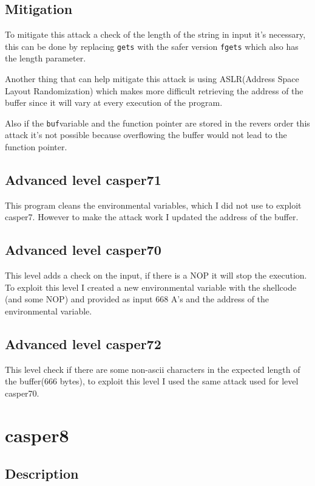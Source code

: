 \documentclass[a4paper,12pt]{article}
\begin{document}
\subsection{Mitigation}

To mitigate this attack a check of the length of the string in input it's necessary, this can be done by replacing \texttt{gets} with the safer version \texttt{fgets} which also has the length parameter.

Another thing that can help mitigate this attack is using ASLR(Address Space Layout Randomization)
which makes more difficult retrieving the address of the buffer since it will vary at every execution of the program.

Also if the \texttt{buf}variable and the function pointer are stored in the revers order this attack it's not possible because overflowing the buffer would not lead to the function pointer.

\subsection{Advanced level casper71}
This program cleans the environmental variables, which I did not use to exploit casper7. However to make the attack work I updated the address of the buffer.

\subsection{Advanced level casper70}

This level adds a check on the input, if there is a NOP it will stop the execution. To exploit this level I created a new environmental variable with the shellcode (and some NOP) and provided as input 668 A's and the address of the environmental variable.

\subsection{Advanced level casper72}
This level check if there are some non-ascii characters in the expected length of the buffer(666 bytes), to exploit this level I used the same attack used for level casper70.


\section{casper8}
\subsection{Description}
\end{document}
